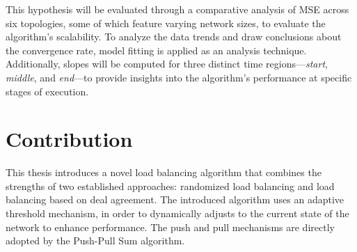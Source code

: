 This hypothesis will be evaluated through a comparative analysis of MSE across six topologies, some of which feature varying network sizes, to evaluate the algorithm's scalability. To analyze the data trends and draw conclusions about the convergence rate, model fitting is applied as an analysis technique. Additionally, slopes will be computed for three distinct time regions—\textit{start}, \textit{middle}, and \textit{end}—to provide insights into the algorithm's performance at specific stages of execution.

\section{Contribution}\label{sec:contribution}
This thesis introduces a novel load balancing algorithm that combines the strengths of two established approaches: randomized load balancing and load balancing based on deal agreement. The introduced algorithm uses an adaptive threshold mechanism, in order to dynamically adjusts to the current state of the network to enhance performance. The push and pull mechanisms are directly adopted by the Push-Pull Sum algorithm.